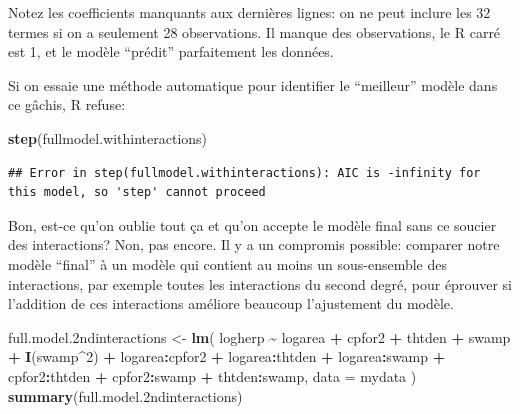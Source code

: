 \documentclass[
  12pt,
]{book}
\newenvironment{Shaded}{\begin{snugshade}}{\end{snugshade}}
\newcommand{\DataTypeTok}[1]{\textcolor[rgb]{0.13,0.29,0.53}{#1}}
\newcommand{\DecValTok}[1]{\textcolor[rgb]{0.00,0.00,0.81}{#1}}
\newcommand{\FloatTok}[1]{\textcolor[rgb]{0.00,0.00,0.81}{#1}}
\newcommand{\KeywordTok}[1]{\textcolor[rgb]{0.13,0.29,0.53}{\textbf{#1}}}
\newcommand{\NormalTok}[1]{#1}
\newcommand{\OperatorTok}[1]{\textcolor[rgb]{0.81,0.36,0.00}{\textbf{#1}}}
\newcommand{\StringTok}[1]{\textcolor[rgb]{0.31,0.60,0.02}{#1}}
\begin{document}
Notez les coefficients manquants aux dernières lignes: on ne peut inclure les 32 termes si on a seulement 28 observations. Il manque des observations, le R carré est 1, et le modèle ``prédit'' parfaitement les données.

Si on essaie une méthode automatique pour identifier le ``meilleur'' modèle dans ce gâchis, R refuse:

\begin{Shaded}
\begin{Highlighting}[]
\KeywordTok{step}\NormalTok{(fullmodel.withinteractions)}
\end{Highlighting}
\end{Shaded}

\begin{verbatim}
## Error in step(fullmodel.withinteractions): AIC is -infinity for this model, so 'step' cannot proceed
\end{verbatim}

Bon, est-ce qu'on oublie tout ça et qu'on accepte le modèle final sans ce soucier des interactions? Non, pas encore. Il y a un compromis possible: comparer notre modèle ``final'' à un modèle qui contient au moins un sous-ensemble des interactions, par exemple toutes les interactions du second degré, pour éprouver si l'addition de ces interactions améliore beaucoup l'ajustement du modèle.

\begin{Shaded}
\begin{Highlighting}[]
\NormalTok{full.model}\FloatTok{.2}\NormalTok{ndinteractions \textless{}{-}}\StringTok{ }\KeywordTok{lm}\NormalTok{(}
\NormalTok{  logherp }\OperatorTok{\textasciitilde{}}\StringTok{ }\NormalTok{logarea }\OperatorTok{+}\StringTok{ }\NormalTok{cpfor2 }\OperatorTok{+}\StringTok{ }\NormalTok{thtden }\OperatorTok{+}\StringTok{ }\NormalTok{swamp }\OperatorTok{+}\StringTok{ }\KeywordTok{I}\NormalTok{(swamp}\OperatorTok{\^{}}\DecValTok{2}\NormalTok{)}
    \OperatorTok{+}\StringTok{ }\NormalTok{logarea}\OperatorTok{:}\NormalTok{cpfor2}
    \OperatorTok{+}\StringTok{ }\NormalTok{logarea}\OperatorTok{:}\NormalTok{thtden}
    \OperatorTok{+}\StringTok{ }\NormalTok{logarea}\OperatorTok{:}\NormalTok{swamp}
    \OperatorTok{+}\StringTok{ }\NormalTok{cpfor2}\OperatorTok{:}\NormalTok{thtden}
    \OperatorTok{+}\StringTok{ }\NormalTok{cpfor2}\OperatorTok{:}\NormalTok{swamp}
    \OperatorTok{+}\StringTok{ }\NormalTok{thtden}\OperatorTok{:}\NormalTok{swamp,}
  \DataTypeTok{data =}\NormalTok{ mydata}
\NormalTok{)}
\KeywordTok{summary}\NormalTok{(full.model}\FloatTok{.2}\NormalTok{ndinteractions)}
\end{Highlighting}
\end{Shaded}
\end{document}
